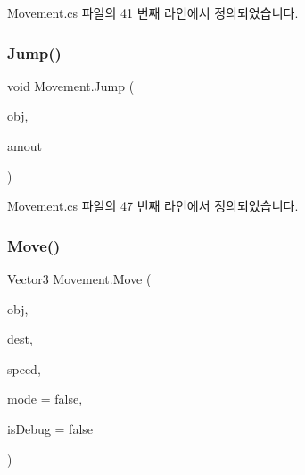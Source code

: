 Movement.\+cs 파일의 41 번째 라인에서 정의되었습니다.


\begin{DoxyCode}{0}

\end{DoxyCode}
\mbox{\label{class_movement_a26c05ac46da17f2f8999f1cce7fa49b8}} 
\subsubsection{\texorpdfstring{Jump()}{Jump()}}
{\footnotesize\ttfamily void Movement.\+Jump (\begin{DoxyParamCaption}\item[{Game\+Object}]{obj,  }\item[{float}]{amout }\end{DoxyParamCaption})}



Movement.\+cs 파일의 47 번째 라인에서 정의되었습니다.


\begin{DoxyCode}{0}

\end{DoxyCode}
\mbox{\label{class_movement_a5557f0e70e137025e19e406472daf36c}} 
\subsubsection{\texorpdfstring{Move()}{Move()}}
{\footnotesize\ttfamily Vector3 Movement.\+Move (\begin{DoxyParamCaption}\item[{Game\+Object}]{obj,  }\item[{Vector3}]{dest,  }\item[{float}]{speed,  }\item[{bool}]{mode = {\ttfamily false},  }\item[{bool}]{is\+Debug = {\ttfamily false} }\end{DoxyParamCaption})}



